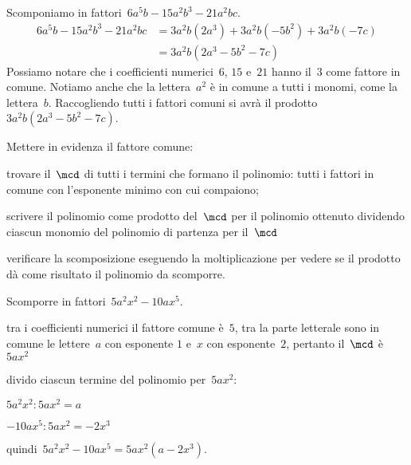  \begin{esempio}
Scomponiamo in fattori~$6a^{5}b-15a^{2}b^{3}-21a^{2}bc$.
 \begin{equation*}
   \begin{split}
    6a^{5}b-15a^{2}b^{3}-21a^{2}bc 
    &=3a^{2}b(2a^{3})+3a^{2}b(-5b^{2})+3a^{2}b(-7c)\\
    &=3a^{2}b\left(2a^{3}-5b^{2}-7c\right)
   \end{split}
 \end{equation*}
Possiamo notare che i coefficienti numerici~$6$, $15$ e~$21$ hanno il~$3$ 
come fattore in comune.
Notiamo anche che la lettera~$a^{2}$ è in comune a tutti i monomi, come la 
lettera~$b$. 
Raccogliendo tutti i fattori comuni si avrà il prodotto
$3a^{2}b\left(2a^{3}-5b^{2}-7c\right)$.
 \end{esempio}

\begin{procedura}
Mettere in evidenza il fattore comune:
\begin{enumeratea}
\item trovare il~$\mcd$ di tutti i termini che formano il polinomio: tutti i 
 fattori in comune con l'esponente minimo con cui compaiono;
\item scrivere il polinomio come prodotto del~$\mcd$ per il polinomio ottenuto 
 dividendo ciascun monomio del polinomio di partenza per il~$\mcd$
\item verificare la scomposizione eseguendo la moltiplicazione per vedere se 
 il prodotto dà come risultato il polinomio da scomporre.
\end{enumeratea}
\end{procedura}

 \begin{esempio}
Scomporre in fattori~$5a^{2}x^{2}-10ax^{5}$.
  \begin{enumeratea}
  \item tra i coefficienti numerici il fattore comune è~$5$, 
   tra la parte letterale sono in comune le lettere~$a$ con esponente $1$ 
   e~$x$ con esponente~$2$, pertanto il~$\mcd$ è~$5ax^{2}$
 \item divido ciascun termine del polinomio per~$5ax^{2}$:
   \begin{itemize*}
   \item $5a^{2}x^{2}:5ax^{2}=a$
   \item $-10ax^{5}:5ax^{2}=-2x^{3}$
   \end{itemize*}
  \item quindi~$5a^{2}x^{2}-10ax^{5}=5ax^{2}(a-2x^{3})$.
  \end{enumeratea}
 \end{esempio}

